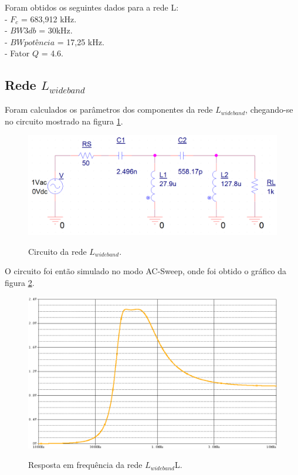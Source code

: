 Foram obtidos os seguintes dados para a rede L:\\
 - $F_c$ = 683,912 kHz. \\
 - $BW3db$ = 30kHz. \\ 
 - $BW potência$ = 17,25 kHz. \\ 
 - Fator $Q$ = 4.6. \\
 
 \subsection{Rede $L_{wideband}$}
 
 Foram calculados os parâmetros dos componentes da rede $L_{wideband}$, chegando-se no circuito mostrado na figura \ref{f_sch_rede_L_wideband}.
 
 \begin{figure}[H]
     \centering
     \caption{Circuito da rede $L_{wideband}$.}
     \includegraphics[scale=0.4]{Imagens/sch_rede_L_wideband.png}
     \label{f_sch_rede_L_wideband}
    \end{figure}
    
    O circuito foi então simulado no modo AC-Sweep, onde foi obtido o gráfico da figura \ref{f_rede_L_wideband_graph}.
    
    \begin{figure}[H]
        \centering
        \caption{Resposta em frequência da rede $L_{wideband}$L.}
        \includegraphics[scale=0.4]{Imagens/rede_L_wideband_graph.png}
        \label{f_rede_L_wideband_graph}
    \end{figure}
    
